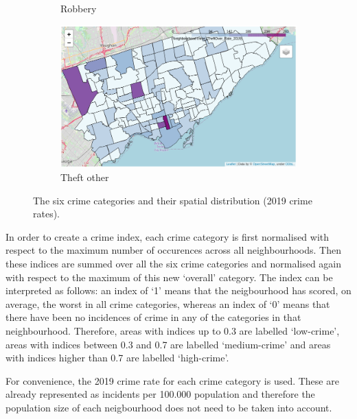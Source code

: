 \documentclass{article}
\begin{document}
\begin{figure}[ht]
\begin{subfigure}[b]{0.47\textwidth}
         \caption{Robbery}
     \end{subfigure}
     \hfill
     \begin{subfigure}[b]{0.47\textwidth}
         \centering
         \includegraphics[width=\textwidth]{pics/theftover}
         \caption{Theft other}
     \end{subfigure}
        \caption{The six crime categories and their spatial distribution (2019 crime rates).}
        \label{fig:nbhcrime}
\end{figure}

In order to create a crime index, each crime category is first normalised with respect to the maximum number of occurences across all neighbourhoods. Then these indices are summed over all the six crime categories and normalised again with respect to the maximum of this new `overall' category. The index can be interpreted as follows: an index of `1' means that the neigbourhood has scored, on average, the worst in all crime categories, whereas an index of `0' means that there have been no incidences of crime in any of the categories in that neighbourhood. Therefore, areas with indices up to 0.3 are labelled `low-crime', areas with indices between 0.3 and 0.7 are labelled `medium-crime' and areas with indices higher than 0.7 are labelled `high-crime'.

For convenience, the 2019 crime rate for each crime category is used. These are already represented as incidents per 100.000 population and therefore the population size of each neigbourhood does not need to be taken into account.
\end{document}
